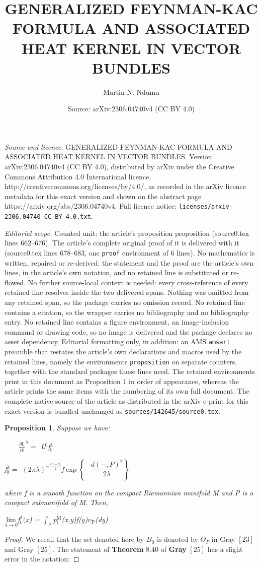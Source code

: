 \documentclass[10pt,a4paper]{amsart}
\title{GENERALIZED FEYNMAN-KAC FORMULA AND ASSOCIATED HEAT KERNEL IN VECTOR BUNDLES}
\author{Martin N. Ndumu}
\date{Source: arXiv:2306.04740v4 (CC BY 4.0)}
\newtheorem{proposition}{Proposition}
\begin{document}
\maketitle

\noindent\emph{Source and licence.} GENERALIZED FEYNMAN-KAC FORMULA AND ASSOCIATED HEAT KERNEL IN VECTOR BUNDLES. Version arXiv:2306.04740v4 (CC BY 4.0), distributed by arXiv under the Creative Commons Attribution 4.0 International licence, http://creativecommons.org/licenses/by/4.0/, as recorded in the arXiv licence metadata for this exact version and shown on the abstract page https://arxiv.org/abs/2306.04740v4. Full licence notice: \texttt{licenses/arxiv-2306.04740-CC-BY-4.0.txt}.\par\smallskip

\noindent\textit{Editorial scope.} Counted unit: the article's proposition proposition (source0.tex lines 662--676). The article's complete original proof of it is delivered with it (source0.tex lines 678--683, one \texttt{proof} environment of 6 lines). No mathematics is written, repaired or re-derived: the statement and the proof are the article's own lines, in the article's own notation, and no retained line is substituted or re-flowed.  No further source-local context is needed: every cross-reference of every retained line resolves inside the two delivered spans.  Nothing was omitted from any retained span, so the package carries no omission record.  No retained line contains a citation, so the wrapper carries no bibliography and no bibliography entry.  No retained line contains a figure environment, an image-inclusion command or drawing code, so no image is delivered and the package declares no asset dependency.  Editorial formatting only, in addition: an AMS \texttt{amsart} preamble that restates the article's own declarations and macros used by the retained lines, namely the environments \texttt{proposition} on separate counters, together with the standard packages those lines need.  The retained environments print in this document as Proposition 1 in order of appearance, whereas the article prints the same items with the numbering of its own full document.  The complete native source of the article as distributed in the arXiv e-print for this exact version is bundled unchanged as \texttt{sources/142645/source0.tex}.
\begin{proposition}
Suppose we have:

$\qquad\frac{\partial\text{f}_{\text{t}}}{\partial\text{t}}^{\lambda}=$
L$^{0}$f$_{\text{t}}^{\lambda}$

\qquad f$_{0}^{\lambda}=$ $(2\pi\lambda)^{-\frac{({n-q)}}{2}}$f$\exp\left\{
-\dfrac{d(-,P)^{2}}{2\lambda}\right\}  $

where f is a smooth function on the compact Riemannian manifold M and P is a
compact submanifold of M. Then,

$\underset{\lambda\rightarrow0}{\text{lim}}$f$_{\text{t}}^{\lambda}($x) =
$\int_{\text{P}}$p$_{\text{t}}^{\text{M}}$(x,y)f(y)$\upsilon_{\text{P}}$(dy)
\end{proposition}

\begin{proof}
We recall that the set denoted here by $B_{0}$ is denoted by $\Theta_{P}$ in
Gray $\left[  23\right]  $ and Gray $\left[  25\right]  .$ The statement of
\textbf{Theorem }$8.40$ of \textbf{Gray }$\left[  25\right]  $ has a slight
error in the notation:
\end{proof}
\end{document}
